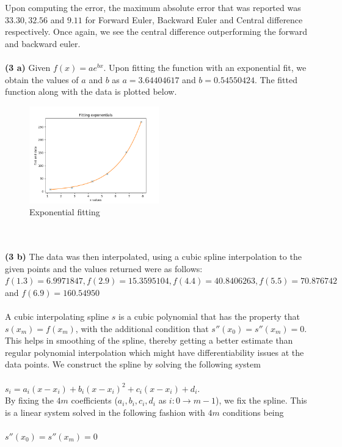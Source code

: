 \documentclass[12pt]{article}
\begin{document}
Upon computing the error, the maximum absolute error that was reported was $33.30, 32.56$ and $9.11$ for Forward Euler, Backward Euler and Central difference respectively. Once again, we see the central difference outperforming the forward and backward euler. \\\\
\textbf{(3 a)} Given $f(x) = ae^{bx}$. Upon fitting the function with an exponential fit, we obtain the values of $a$ and $b$ as $a = 3.64404617$ and $b = 0.54550424$. The fitted function along with the data is plotted below. 
\begin{figure}[h]
	\centering
	\includegraphics[width=0.50\textwidth]{exp_fitting.png}
	\caption{Exponential fitting}
\end{figure}\\\\
\textbf{(3 b)} The data was then interpolated, using a cubic spline interpolation to the given points and the values returned were as follows: $f(1.3) = 6.9971847, f(2.9) = 15.3595104, f(4.4) = 40.8406263, f(5.5) = 70.876742$ and $f(6.9) = 160.54950$ \\\\
A cubic interpolating spline $s$ is a cubic polynomial that has the property that $s(x_m) = f(x_m)$, with the additional condition that $s''(x_0) = s''(x_m) =0$. This helps in smoothing of the spline, thereby getting a better estimate than regular polynomial interpolation which might have differentiability issues at the data points. 
We construct the spline by solving the following system\\\\
$s_i = a_i(x-x_i) + b_i(x-x_i)^2 + c_i(x-x_i) + d_i$. \\ By fixing the $4m$ coefficients ($a_i, b_i, c_i, d_i$ as $i: 0 \rightarrow m-1$), we fix the spline. This is a linear system solved in the following fashion with $4m$ conditions being \\\\
$s''(x_0) = s''(x_m) = 0$\\
\end{document}
